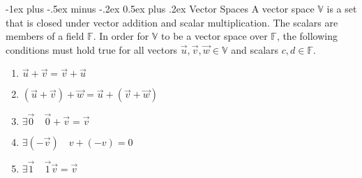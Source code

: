 \documentclass[10pt,landscape,letterpaper]{article}
\makeatletter
\renewcommand{\section}{\@startsection{section}{1}{0mm}%
                                {-1ex plus -.5ex minus -.2ex}%
                                {0.5ex plus .2ex}%
                                {\normalfont\large\bfseries}}
\newcommand{\bvec}[1]{\mathbf{#1}}
\newcommand{\vecspace}[1]{\mathbb{#1}}
\makeatother
\begin{document}
\begin{multicols}{3}
\section{Vector Spaces}
A vector space $\vecspace{V}$ is a set that is closed under vector addition and scalar multiplication. The scalars are members of a field $\vecspace{F}$.
In order for $\vecspace{V}$ to be a vector space over $\vecspace{F}$, the following conditions must hold true for all vectors $\vec u, \vec v, \vec w \in \vecspace{V}$ and scalars $c,d \in \vecspace{F}$.
\begin{multicols}{2}
\begin{enumerate}[leftmargin=*]
    \item $\vec u+ \vec v=\vec v+\vec u$

    
    \item $(\vec u+\vec v)+\vec w=\vec u+(\vec v+\vec w)$
    
    \item $\exists \vec{0} \quad \vec{0}+\vec{v}=\vec{v}$
    
    \item $\exists (-\vec{v}) \quad v+(-v)=0$

    \item $\exists \vec{1} \quad \vec{1}\vec{v}=\vec{v}$
    

\end{enumerate}
\end{multicols}
\end{multicols}
\end{document}
